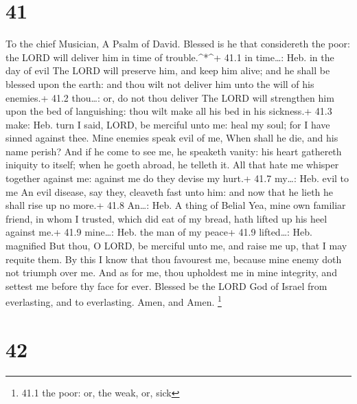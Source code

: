 \hypertarget{section-40}{%
\section{41}\label{section-40}}

To the chief Musician, A Psalm of David.  Blessed is he that
considereth the poor: the LORD will deliver him in time of
trouble.\^{}*\^{}+ 41.1 in time\ldots: Heb. in the day of evil
 The LORD will preserve him, and keep him alive; and he
shall be blessed upon the earth: and thou wilt not deliver him unto the
will of his enemies.+ 41.2 thou\ldots: or, do not thou deliver
 The LORD will strengthen him upon the bed of languishing:
thou wilt make all his bed in his sickness.+ 41.3 make: Heb. turn
 I said, LORD, be merciful unto me: heal my soul; for I have
sinned against thee.  Mine enemies speak evil of me, When
shall he die, and his name perish?  And if he come to see
me, he speaketh vanity: his heart gathereth iniquity to itself; when he
goeth abroad, he telleth it.  All that hate me whisper
together against me: against me do they devise my hurt.+ 41.7 my\ldots:
Heb. evil to me  An evil disease, say they, cleaveth fast
unto him: and now that he lieth he shall rise up no more.+ 41.8
An\ldots: Heb. A thing of Belial  Yea, mine own familiar
friend, in whom I trusted, which did eat of my bread, hath lifted up his
heel against me.+ 41.9 mine\ldots: Heb. the man of my peace+ 41.9
lifted\ldots: Heb. magnified  But thou, O LORD, be merciful
unto me, and raise me up, that I may requite them.  By this
I know that thou favourest me, because mine enemy doth not triumph over
me.  And as for me, thou upholdest me in mine integrity,
and settest me before thy face for ever.  Blessed be the
LORD God of Israel from everlasting, and to everlasting. Amen, and Amen.
\footnote{41.1 the poor: or, the weak, or, sick}

\hypertarget{section-41}{%
\section{42}\label{section-41}}

